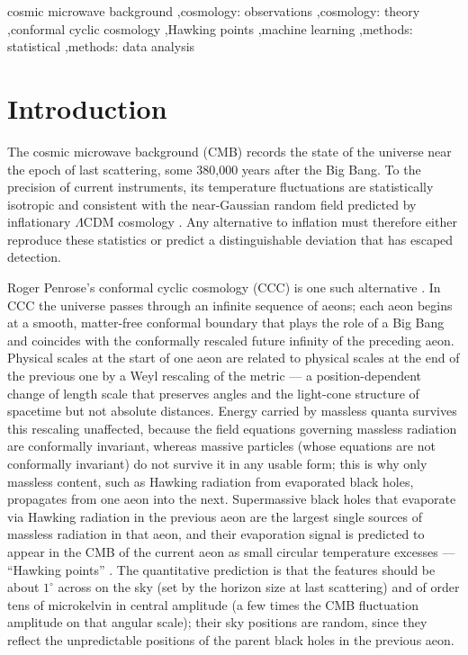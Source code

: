 \documentclass[preprint,12pt,nonatbib]{elsarticle}
\begin{document}
\begin{frontmatter}
\begin{keyword}
cosmic microwave background \sep cosmology: observations \sep cosmology: theory \sep conformal cyclic cosmology \sep Hawking points \sep machine learning \sep methods: statistical \sep methods: data analysis
\end{keyword}

\end{frontmatter}

\section{Introduction}\label{sec:intro}

The cosmic microwave background (CMB) records the state of the universe near the epoch of last scattering, some 380{,}000 years after the Big Bang. To the precision of current instruments, its temperature fluctuations are statistically isotropic and consistent with the near-Gaussian random field predicted by inflationary $\Lambda$CDM cosmology \citep{planck2018_i,planck2018_vi}. Any alternative to inflation must therefore either reproduce these statistics or predict a distinguishable deviation that has escaped detection.

Roger Penrose's conformal cyclic cosmology (CCC) is one such alternative \citep{penrose_ccc_2010}. In CCC the universe passes through an infinite sequence of aeons; each aeon begins at a smooth, matter-free conformal boundary that plays the role of a Big Bang and coincides with the conformally rescaled future infinity of the preceding aeon. Physical scales at the start of one aeon are related to physical scales at the end of the previous one by a Weyl rescaling of the metric --- a position-dependent change of length scale that preserves angles and the light-cone structure of spacetime but not absolute distances. Energy carried by massless quanta survives this rescaling unaffected, because the field equations governing massless radiation are conformally invariant, whereas massive particles (whose equations are not conformally invariant) do not survive it in any usable form; this is why only massless content, such as Hawking radiation from evaporated black holes, propagates from one aeon into the next. Supermassive black holes that evaporate via Hawking radiation \citep{hawking_1975} in the previous aeon are the largest single sources of massless radiation in that aeon, and their evaporation signal is predicted to appear in the CMB of the current aeon as small circular temperature excesses --- ``Hawking points'' \citep{an_amnp_2018}. The quantitative prediction is that the features should be about $1^\circ$ across on the sky (set by the horizon size at last scattering) and of order tens of microkelvin in central amplitude (a few times the CMB fluctuation amplitude on that angular scale); their sky positions are random, since they reflect the unpredictable positions of the parent black holes in the previous aeon.
\end{document}

